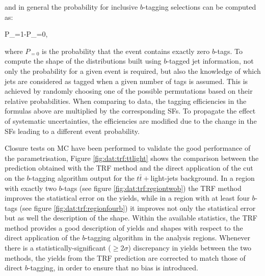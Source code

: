\noindent and in general the probability for inclusive $b$-tagging selections can be computed as:
  
\be
P_{}=1-P_{=0},
\ee
  
 \noindent where $P_{=0}$ is the probability that the event contains exactly zero $b$-tags. To compute the shape of the distributions built using $b$-tagged jet information, not only the probability for a given event is required, but also the knowledge of which jets are considered as tagged when a given number of tags is assumed. This is achieved by randomly choosing one of the possible permutations based on their relative probabilities. When comparing to data, the tagging efficiencies in the formulas above are multiplied by the corresponding SFs. To propagate the effect of systematic uncertainties, the efficiencies are modified due to the change in the SFs leading to a different event probability.\par
Closure tests on MC have been performed to validate the good performance of the parametrisation, Figure \ref{fig:dat:trf:ttlight} shows the comparison between the prediction obtained with the TRF method and the direct application of the cut on the $b$-tagging algorithm output for the $t\bar{t}+$light-jets background. In a region with exactly two $b$-tags (see figure \ref{fig:dat:trf:regiontwob}) the TRF method improves the statistical error on the yields, while in a region with at least four $b$-tags (see figure \ref{fig:dat:trf:regionfourb}) it improves not only the statistical error but as well the description of the shape. Within the available statistics, the TRF method provides a good description of yields and shapes with respect to the direct application of the $b$-tagging algorithm in the analysis regions. Whenever there is a statistically-significant ($\geq 2\sigma$) discrepancy in yields between the two methods, the yields from the TRF prediction are corrected to match those of direct $b$-tagging, in order to ensure that no bias is introduced.

